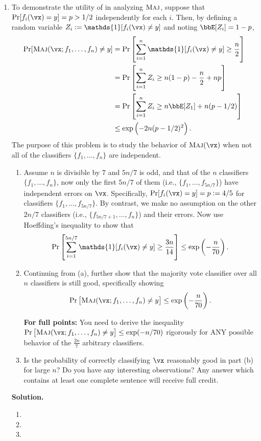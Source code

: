 \documentclass{article}
\def\1{\mathds{1}}
\theoremstyle{definition}
\theoremstyle{remark}
\newenvironment{Q}
{%
\clearpage
\item
}
{%
\phantom{s}%
\bigskip%
\noindent\textbf{Solution.}
}
\begin{document}
\begin{enumerate}[font={\Large\bfseries},left=0pt]
\begin{Q}
    To demonstrate the utility of  in analyzing $\textsc{Maj}$, suppose
    that $\Pr[ f_i(\vx) = y ] = p > 1/2$ independently for each $i$.
    Then, by defining a random variable $Z_i := \1[ f_i(\vx) \neq y]$
    and noting $\bbE [Z_i] = 1 - p$,
    \begin{align*}
      \Pr[\maj(\vx;f_1,\ldots,f_n) \neq y]
      &=
      \Pr\sbr{ \sum_{i=1}^n \1[ f_i(\vx) \neq y] \geq \frac n 2 }
      \\
      &=
      \Pr\sbr{ \sum_{i=1}^n Z_i \geq n(1-p) - \frac n 2 + np }
      \\
      &=
      \Pr\sbr{ \sum_{i=1}^n Z_i \geq n \bbE [Z_1] + n(p-1/2) }
      \\
      &\leq
      \exp\del{ -2n(p-1/2)^2 }.
    \end{align*}
    The purpose of this problem is to study the behavior of $\maj(\vx)$ when not all of the classifiers $\{f_1,\ldots,f_n\}$ are independent.
    \begin{enumerate}
      \item
        Assume $n$ is divisible by $7$ and $5n/7$ is odd,
        and that of the $n$ classifiers $\{f_1,\ldots,f_n\}$,
        now only the first $5n/7$ of them (i.e., $\{f_1,\ldots,f_{5n/7}\}$) have independent errors on $\vx$.
        Specifically, $\Pr[f_i(\vx) = y] = p := 4/5$ for classifiers $\{f_1,\ldots,f_{5n/7}\}$.
        By contrast, we make no assumption on the other $2n/7$ classifiers (i.e., $\{f_{5n/7+1},\ldots,f_{n}\}$) and their errors. Now use Hoeffding's inequality to show that            
        \[
          \Pr\sbr{ \sum_{i=1}^{5n/7} \1[ f_i(\vx) \neq y] \geq \frac{3n}{14} }\le
         \exp\del{ -\frac{n}{70}  }.
   \]
   
     \item Continuing from (a), further show that the majority vote classifier
     over all $n$ classifiers is still good,  specifically showing  \[
     \Pr\sbr{ \maj(\vx;f_1,\ldots,f_n) \neq y } \leq \exp\del{ -\frac{n}{70}  }.
     \]
     
 
 \textbf{For full points:} You need to derive the inequality $\Pr\sbr{ \maj(\vx;f_1,\dots,f_n) \neq y } \leq \exp(-n / 70)$ rigorously for ANY possible behavior of the $\frac{2n}{7}$ arbitrary classifiers.


     \item Is the probability of correctly classifying $\vx$ reasonably good in part (b) for large $n$? Do you have any interesting observations? Any answer which contains at least one complete sentence will receive full credit.
    \end{enumerate}

\end{Q}
\begin{enumerate}
  \item
  \item
  \item
\end{enumerate}
\end{enumerate}
\end{document}
